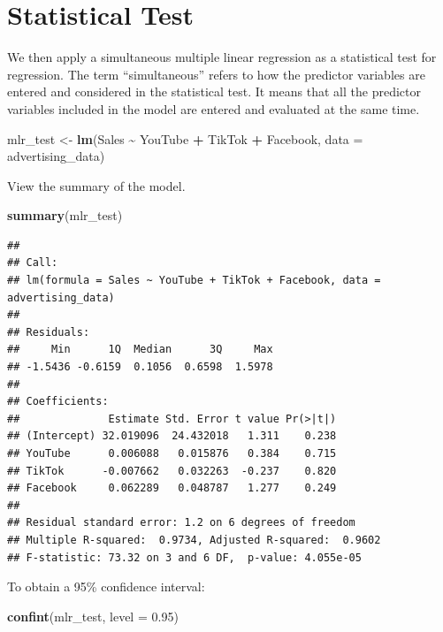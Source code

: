 \documentclass[
]{article}
\newenvironment{Shaded}{\begin{snugshade}}{\end{snugshade}}
\newcommand{\AttributeTok}[1]{\textcolor[rgb]{0.13,0.29,0.53}{#1}}
\newcommand{\FloatTok}[1]{\textcolor[rgb]{0.00,0.00,0.81}{#1}}
\newcommand{\FunctionTok}[1]{\textcolor[rgb]{0.13,0.29,0.53}{\textbf{#1}}}
\newcommand{\NormalTok}[1]{#1}
\newcommand{\OtherTok}[1]{\textcolor[rgb]{0.56,0.35,0.01}{#1}}
\newcommand{\SpecialCharTok}[1]{\textcolor[rgb]{0.81,0.36,0.00}{\textbf{#1}}}
\begin{document}
\section{Statistical Test}\label{statistical-test}

We then apply a simultaneous multiple linear regression as a statistical
test for regression. The term ``simultaneous'' refers to how the
predictor variables are entered and considered in the statistical test.
It means that all the predictor variables included in the model are
entered and evaluated at the same time.

\begin{Shaded}
\begin{Highlighting}[]
\NormalTok{mlr\_test }\OtherTok{\textless{}{-}} \FunctionTok{lm}\NormalTok{(Sales }\SpecialCharTok{\textasciitilde{}}\NormalTok{ YouTube }\SpecialCharTok{+}\NormalTok{ TikTok }\SpecialCharTok{+}\NormalTok{ Facebook, }\AttributeTok{data =}\NormalTok{ advertising\_data)}
\end{Highlighting}
\end{Shaded}

View the summary of the model.

\begin{Shaded}
\begin{Highlighting}[]
\FunctionTok{summary}\NormalTok{(mlr\_test)}
\end{Highlighting}
\end{Shaded}

\begin{verbatim}
## 
## Call:
## lm(formula = Sales ~ YouTube + TikTok + Facebook, data = advertising_data)
## 
## Residuals:
##     Min      1Q  Median      3Q     Max 
## -1.5436 -0.6159  0.1056  0.6598  1.5978 
## 
## Coefficients:
##              Estimate Std. Error t value Pr(>|t|)
## (Intercept) 32.019096  24.432018   1.311    0.238
## YouTube      0.006088   0.015876   0.384    0.715
## TikTok      -0.007662   0.032263  -0.237    0.820
## Facebook     0.062289   0.048787   1.277    0.249
## 
## Residual standard error: 1.2 on 6 degrees of freedom
## Multiple R-squared:  0.9734, Adjusted R-squared:  0.9602 
## F-statistic: 73.32 on 3 and 6 DF,  p-value: 4.055e-05
\end{verbatim}

To obtain a 95\% confidence interval:

\begin{Shaded}
\begin{Highlighting}[]
\FunctionTok{confint}\NormalTok{(mlr\_test, }\AttributeTok{level =} \FloatTok{0.95}\NormalTok{)}
\end{Highlighting}
\end{Shaded}
\end{document}
